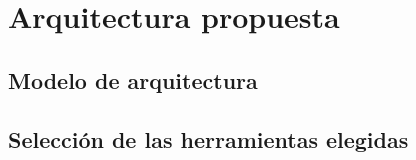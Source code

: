 \section{Arquitectura propuesta}

\subsection{Modelo de arquitectura}

\subsection{Selección de las herramientas elegidas}